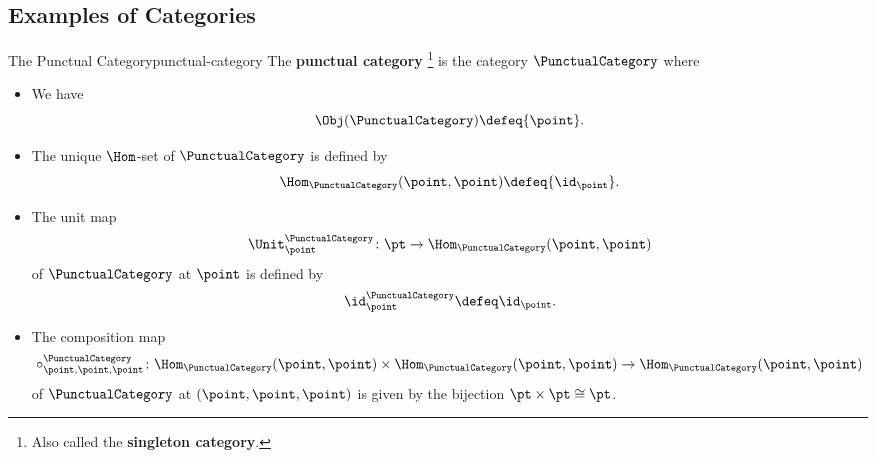 \subsection{Examples of Categories}\label{subsection-examples-of-categories}
\begin{example}{The Punctual Category}{punctual-category}%
    The \textbf{punctual category}%
    \footnote{%
        Also called the \textbf{singleton category}.
        \par\vspace*{-1.75\baselineskip}
    } %
    is the category $\PunctualCategory$ where
    \begin{itemize}
        \item{}We have
            \[
                \Obj(\PunctualCategory)
                \defeq
                \{\point\}.
            \]
        \item{}The unique $\Hom$-set of $\PunctualCategory$ is defined by
            \[
                \Hom_{\PunctualCategory}(\point,\point)
                \defeq
                \{\id_{\point}\}.
            \]%
        \item{}The unit map
            \[
                \Unit^{\PunctualCategory}_{\point}
                \colon
                \pt
                \to
                \Hom_{\PunctualCategory}(\point,\point)
            \]%
            of $\PunctualCategory$ at $\point$ is defined by
            \[
                \id^{\PunctualCategory}_{\point}
                \defeq
                \id_{\point}.
            \]%
        \item{}The composition map
            \[
                \circ^{\PunctualCategory}_{\point,\point,\point}
                \colon
                \Hom_{\PunctualCategory}(\point,\point)
                \times
                \Hom_{\PunctualCategory}(\point,\point)
                \to
                \Hom_{\PunctualCategory}(\point,\point)
            \]%
            of $\PunctualCategory$ at $(\point,\point,\point)$ is given by the bijection $\pt\times\pt\cong\pt$.
    \end{itemize}
\end{example}
